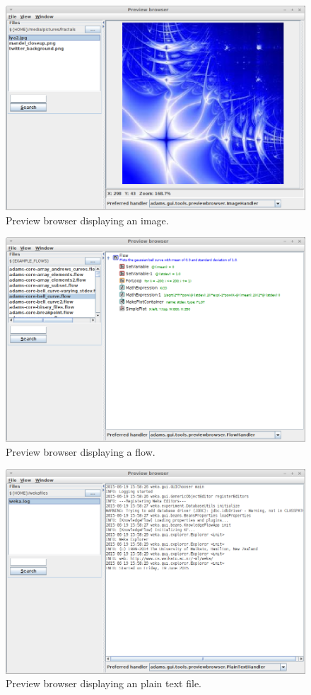 \begin{figure}[htb]
  \centering
  \includegraphics[width=12.0cm]{images/previewbrowser-image1.png}
  \caption{Preview browser displaying an image.}
  \label{previewbrowser-image1}
\end{figure}

\begin{figure}[htb]
  \centering
  \includegraphics[width=12.0cm]{images/previewbrowser-flow1.png}
  \caption{Preview browser displaying a flow.}
  \label{previewbrowser-flow1}
\end{figure}

\begin{figure}[htb]
  \centering
  \includegraphics[width=12.0cm]{images/previewbrowser-plaintext1.png}
  \caption{Preview browser displaying an plain text file.}
  \label{previewbrowser-plaintext1}
\end{figure}

